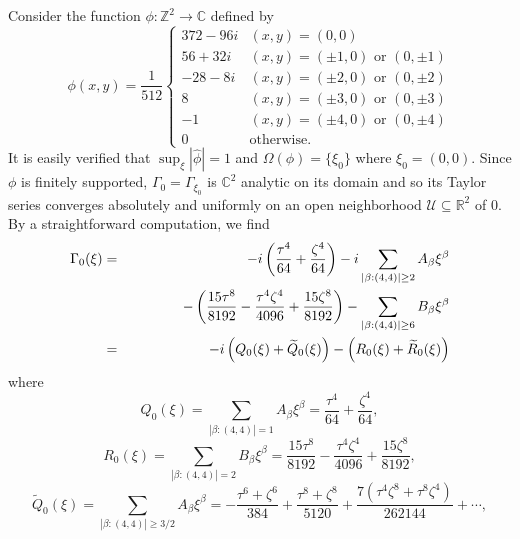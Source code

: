 \documentclass[11pt, letter]{book}
\newenvironment{example}
  {\pushQED{\qed}\renewcommand{\qedsymbol}{$\triangle$}\examplex}
  {\popQED\endexamplex}
\newcommand{\lp}{\left(}
\newcommand{\rp}{\right)}
\newcommand{\f}[2]{\frac{#1}{#2}}
\begin{document}
\begin{example}\normalfont


Consider the function $\phi : \mathbb{Z}^2 \to \mathbb{C}$ defined by 
\begin{equation*}
    \phi(x,y) =
    \frac{1}{512}
    \begin{cases}
    372 - 96i &(x,y) = (0,0)\\
    56+32i &(x,y) = (\pm 1, 0)\mbox{ or }(0,\pm 1)\\
    -28-8i        &(x,y) = (\pm 2,0)\mbox{ or }(0,\pm 2)\\
    8       &(x,y) = (\pm 3,0)\mbox{ or }(0,\pm 3)\\
    -1        &(x,y) = (\pm 4,0)\mbox{ or }(0,\pm 4)\\
    0& \text{otherwise}.
    \end{cases}
\end{equation*}
It is easily verified that $\sup_{\xi}|\widehat{\phi}|=1$ and $\Omega(\phi) = \{\xi_0 \}$ where $\xi_0=(0,0)$. Since $\phi$ is finitely supported, $\Gamma_{0}=\Gamma_{\xi_0}$ is $\mathbb{C}^2$ analytic on its domain and so its Taylor series converges absolutely and uniformly on an open neighborhood $\mathcal{U}\subseteq \mathbb{R}^2$ of $0$. By a straightforward computation, we find 
\begin{eqnarray*}
\Gamma_{0}(\xi)
&=& 
-i\lp \frac{\tau^4}{64} + \frac{\zeta^4}{64}   \rp
-i \sum_{|\beta:(4,4)|\geq 2}A_\beta \xi^\beta\\
&& 
\hspace{1.3cm}
-\lp \f{15\tau^8}{8192} - \f{\tau^4\zeta^4}{4096} + \f{15\zeta^8}{8192}   \rp 
- \sum_{|\beta:(4,4)|\geq 6}B_\beta \xi^\beta\\
&=&-i\lp Q_{0}(\xi)+\widetilde{Q}_{0}(\xi)\rp-\lp R_0(\xi)+\widetilde{R}_0(\xi)\rp
\end{eqnarray*}
where
\begin{equation*}
Q_{0}(\xi)=\sum_{|\beta:(4,4)|=1}A_\beta \xi^\beta=\frac{\tau^4}{64} + \frac{\zeta^4}{64} ,
\end{equation*}
\begin{equation*}
R_{0}(\xi)=\sum_{|\beta:(4,4)|=2}B_\beta\xi^\beta
=  \f{15\tau^8}{8192} - \f{\tau^4\zeta^4}{4096} + \f{15\zeta^8}{8192}  , 
\end{equation*}
\begin{equation*}
\widetilde{Q}_{0}(\xi)= \sum_{|\beta:(4,4)| \geq 3/2}A_\beta \xi^\beta= 
-\f{\tau^6+\zeta^6}{384}  + \f{\tau^8 + \zeta^8}{5120}+  \f{7(\tau^4\zeta^8+\tau^8\zeta^4)}{262144} +
\cdots, 
\end{equation*}

\end{example}
\end{document}
